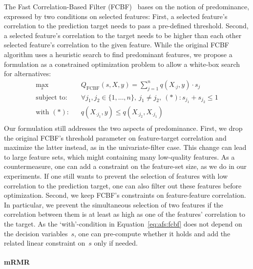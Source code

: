 \documentclass{article}
\theoremstyle{definition}
\begin{document}
The Fast Correlation-Based Filter (FCBF)~\cite{yu2003feature} bases on the notion of predominance, expressed by two conditions on selected features:
First, a selected feature's correlation to the prediction target needs to pass a pre-defined threshold.
Second, a selected feature's correlation to the target needs to be higher than each other selected feature's correlation to the given feature.
While the original FCBF algorithm uses a heuristic search to find predominant features, we propose a formulation as a constrained optimization problem to allow a white-box search for alternatives:
%
\begin{equation}
	\begin{aligned}
		\max_s &\quad Q_{\text{FCBF}}(s,X,y) = \sum_{j=1}^{n} q(X_{\cdot{}j},y) \cdot s_j \\
		\text{subject to:} &\quad \forall j_1, j_2 \in \{1, \dots, n\},~j_1 \neq j_2,~(*): s_{j_1} + s_{j_2} \leq 1 \\
		\text{with } (*) \text{:} &\quad q(X_{\cdot{}j_1},y) \leq q(X_{\cdot{}j_2}, X_{\cdot{}j_1}) \\
	\end{aligned}
	\label{eq:afs:fcbf}
\end{equation}
%
Our formulation still addresses the two aspects of predominance.
First, we drop the original FCBF's threshold parameter on feature-target correlation and maximize the latter instead, as in the univariate-filter case.
This change can lead to large feature sets, which might containing many low-quality features.
As a countermeasure, one can add a constraint on the feature-set size, as we do in our experiments.
If one still wants to prevent the selection of features with low correlation to the prediction target, one can also filter out these features before optimization.
Second, we keep FCBF's constraints on feature-feature correlation.
In particular, we prevent the simultaneous selection of two features if the correlation between them is at least as high as one of the features' correlation to the target.
As the `with'-condition in Equation~\ref{eq:afs:fcbf} does not depend on the decision variables~$s$, one can pre-compute whether it holds and add the related linear constraint on~$s$ only if needed.

\paragraph{mRMR}
\end{document}

